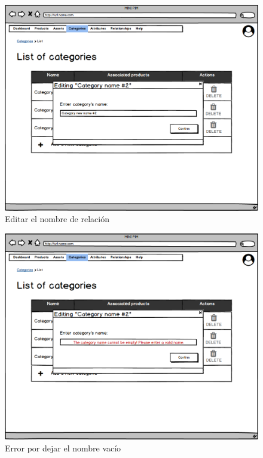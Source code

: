 \newpage %

\begin{figure}[H]
    \includegraphics[width=1\linewidth]{assets/mockups/RF4.3_1.png}
    \caption{Editar el nombre de relación}
   \end{figure}
\vspace{1.0cm}

\begin{figure}[H]
    \includegraphics[width=1\linewidth]{assets/mockups/RF4.3_2.png}
    \caption{Error por dejar el nombre vacío}
   \end{figure}
\vspace{1.0cm}

